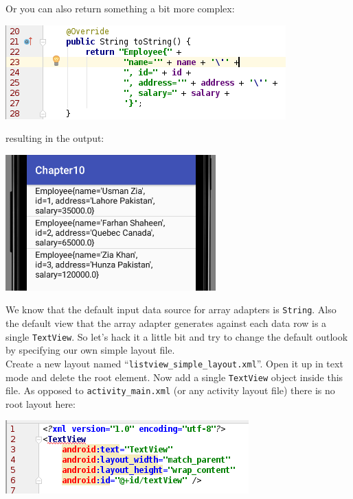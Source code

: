 Or you can also return something a bit more complex:

\begin{center}
	\includegraphics[scale=0.4]{chapters/ch10/images/19}
\end{center}

resulting in the output:

\begin{center}
	\includegraphics[scale=0.4]{chapters/ch10/images/20}
\end{center}

We know that the default input data source for array adapters is \texttt{String}. Also the default view that the array adapter generates against each data row is a single \texttt{TextView}. So let's hack it a little bit and try to change the default outlook by specifying our own simple layout file. \\

Create a new layout named ``\texttt{listview\_simple\_layout.xml}''. Open it up in text mode and delete the root element. Now add a single \texttt{TextView} object inside this file. As opposed to \texttt{activity\_main.xml} (or any activity layout file) there is no root layout here:

\begin{center}
	\includegraphics[scale=0.4]{chapters/ch10/images/21}
\end{center}


